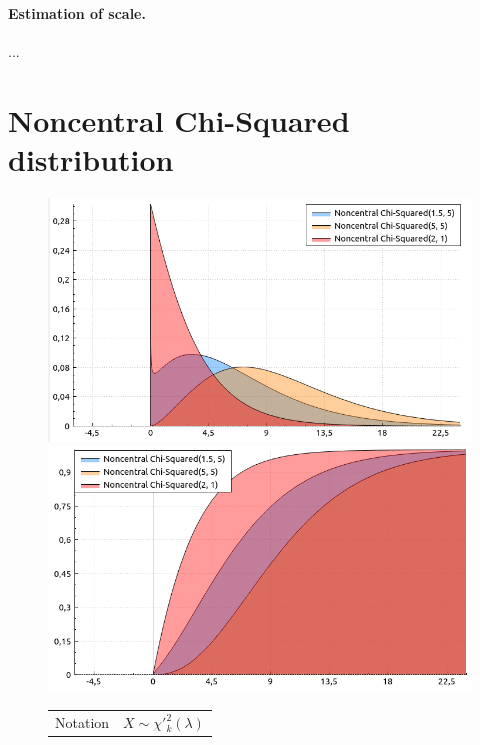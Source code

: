 \documentclass[a4paper,11pt]{article}
\theoremstyle{plain}
\theoremstyle{definition}
\begin{document}
	\paragraph{Estimation of scale.}
	...%
	
	\pagebreak
	\section{Noncentral Chi-Squared distribution}
	\begin{figure}[!htb]\centering
	\begin{minipage}{0.55\textwidth}
		\includegraphics[width=\linewidth, right]{noncentral_chi-squared_pdf}
		\captionsetup{labelformat=empty}
		\includegraphics[width=\linewidth, right]{noncentral_chi-squared_cdf}
		\captionsetup{labelformat=empty}
	\end{minipage}
	\begin{minipage}{0.4\textwidth}
		\begin{tabular}{| r | l |}
			\hline
			Notation & $X \sim \chi'^2_k(\lambda)$ \\

\end{tabular}
\end{minipage}
\end{figure}
\end{document}

